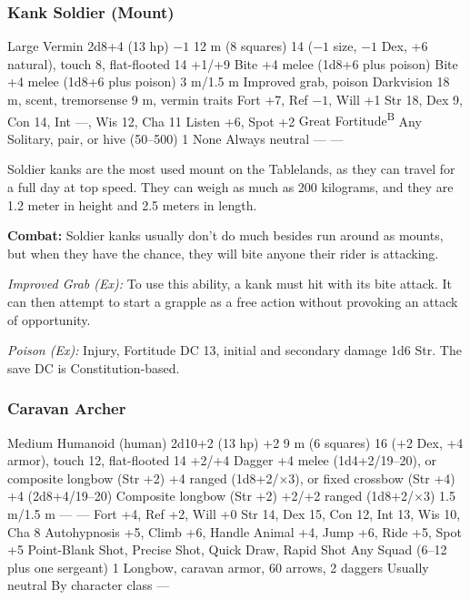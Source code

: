 \subsubsection{Kank Soldier (Mount)}
\begin{MonsterStats}
{Large Vermin}
{2d8+4 (13 hp)}
{$-1$}
{12 m (8 squares)}
{14 ($-1$ size, $-1$ Dex, +6 natural), touch 8, flat-flooted 14}
{+1/+9}
{Bite +4 melee (1d8+6 plus poison)}
{Bite +4 melee (1d8+6 plus poison)}
{3 m/1.5 m}
{Improved grab, poison}
{Darkvision 18 m, scent, tremorsense 9 m, vermin traits}
{Fort +7, Ref $-1$, Will +1}
{Str 18, Dex 9, Con 14, Int ---, Wis 12, Cha 11}
{
	Listen +6,
	Spot +2
}
{
	Great Fortitude\textsuperscript{B}
}
{Any}
{Solitary, pair, or hive (50--500)}
{1}
{None}
{Always neutral}
{---}
{---}
\end{MonsterStats}

Soldier kanks are the most used mount on the Tablelands, as they can travel for a full day at top speed. They can weigh as much as 200 kilograms, and they are 1.2 meter in height and 2.5 meters in length.

\textbf{Combat:} Soldier kanks usually don't do much besides run around as mounts, but when they have the chance, they will bite anyone their rider is attacking.

\textit{Improved Grab (Ex):} To use this ability, a kank must hit with its bite attack. It can then attempt to start a grapple as a free action without provoking an attack of opportunity.

\textit{Poison (Ex):} Injury, Fortitude DC 13, initial and secondary damage 1d6 Str. The save DC is Constitution-based.


\subsubsection{Caravan Archer}
\begin{MonsterStats}
{Medium Humanoid (human)}
{2d10+2 (13 hp)}
{+2}
{9 m (6 squares)}
{16 (+2 Dex, +4 armor), touch 12, flat-flooted 14}
{+2/+4}
{Dagger +4 melee (1d4+2/19--20), or composite longbow (Str +2) +4 ranged (1d8+2/$\times$3), or fixed crossbow (Str +4) +4 (2d8+4/19--20)}
{Composite longbow (Str +2) +2/+2 ranged (1d8+2/$\times$3)}
{1.5 m/1.5 m}
{---}
{---}
{Fort +4, Ref +2, Will +0}
{Str 14, Dex 15, Con 12, Int 13, Wis 10, Cha 8}
{
	Autohypnosis +5,
	Climb +6,
	Handle Animal +4,
	Jump +6,
	Ride +5,
	Spot +5
}
{
	Point-Blank Shot,
	Precise Shot,
	Quick Draw,
	Rapid Shot
}
{Any}
{Squad (6--12 plus one sergeant)}
{1}
{Longbow, caravan armor, 60 arrows, 2 daggers}
{Usually neutral}
{By character class}
{---}
\end{MonsterStats}

